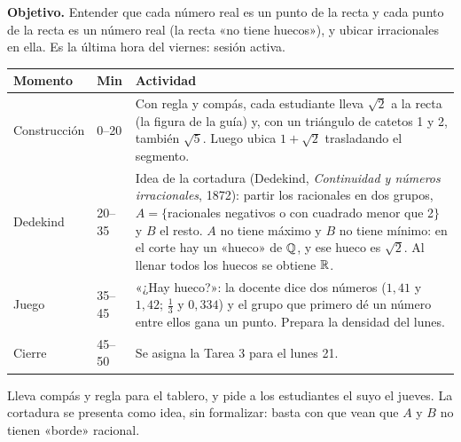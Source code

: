 \documentclass[11pt]{article}
\begin{document}

\textbf{Objetivo.} Entender que cada número real es un punto de la recta y cada punto de la
recta es un número real (la recta «no tiene huecos»), y ubicar irracionales en ella. Es la
última hora del viernes: sesión activa.

\begin{center}
{\renewcommand{\arraystretch}{1.3}
\begin{tabularx}{\linewidth}{@{}l l X@{}}
  \toprule
  \textbf{Momento} & \textbf{Min} & \textbf{Actividad}\\
  \midrule
  Construcción & 0–20 & Con regla y compás, cada estudiante lleva $\sqrt{2}$ a la recta (la
    figura de la guía) y, con un triángulo de catetos 1 y 2, también $\sqrt{5}$. Luego ubica
    $1 + \sqrt{2}$ trasladando el segmento.\\
  Dedekind & 20–35 & Idea de la cortadura (Dedekind, \emph{Continuidad y números
    irracionales}, 1872): partir los racionales en dos grupos, $A = \{$racionales negativos o
    con cuadrado menor que 2$\}$ y $B$ el resto. $A$ no tiene máximo y $B$ no tiene mínimo:
    en el corte hay un «hueco» de $\mathbb{Q}$, y ese hueco es $\sqrt{2}$. Al llenar todos los huecos
    se obtiene $\mathbb{R}$.\\
  Juego & 35–45 & «¿Hay hueco?»: la docente dice dos números ($1{,}41$ y $1{,}42$; $\frac{1}{3}$
    y $0{,}334$) y el grupo que primero dé un número entre ellos gana un punto. Prepara la
    densidad del lunes.\\
  Cierre & 45–50 & Se asigna la Tarea 3 para el lunes 21.\\
  \bottomrule
\end{tabularx}}
\end{center}

\begin{nota}
Lleva compás y regla para el tablero, y pide a los estudiantes el suyo el jueves. La cortadura
se presenta como idea, sin formalizar: basta con que vean que $A$ y $B$ no tienen «borde»
racional.
\end{nota}
\end{document}
